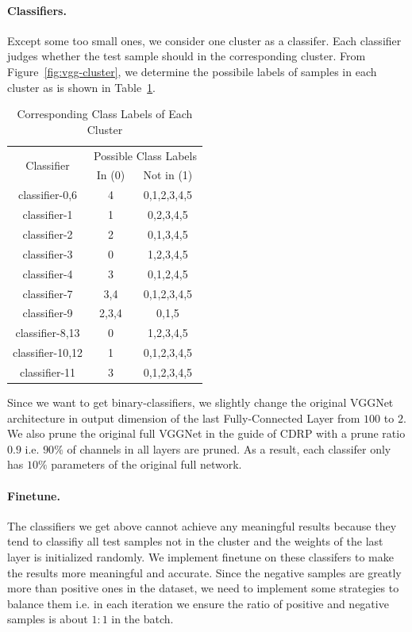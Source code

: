 \documentclass[sigplan,10pt,review]{acmart}\settopmatter{printfolios=true,printccs=false,printacmref=false}
\begin{document}
\paragraph{Classifiers.} Except some too small ones, we consider one cluster as a classifer. Each classifier judges whether the test sample should in the corresponding cluster. 
From Figure~\ref{fig:vgg-cluster}, we determine the possibile labels of samples in each cluster as is shown in Table~\ref{tab:cluster_label}. 

\begin{table}[!htp]
	\begin{tabular}{|c|c|c|}
	\hline
	\multirow{2}{*}{Classifier} &\multicolumn{2}{|c|}{Possible Class Labels}\\
	\cline{2-3}
	& In (0) & Not in (1)\\
	\hline
	classifier-0,6 & 4 & 0,1,2,3,4,5\\
	classifier-1 & 1 & 0,2,3,4,5\\
	classifier-2 & 2 & 0,1,3,4,5\\
	classifier-3 & 0 & 1,2,3,4,5\\
	classifier-4 & 3 & 0,1,2,4,5\\
	classifier-7 & 3,4 & 0,1,2,3,4,5\\ 
	classifier-9 & 2,3,4 & 0,1,5\\ 
	classifier-8,13 & 0 & 1,2,3,4,5\\
	classifier-10,12 & 1 & 0,1,2,3,4,5\\
	classifier-11 & 3 & 0,1,2,3,4,5\\
	\hline

	\end{tabular}
	\caption{Corresponding Class Labels of Each Cluster}
	\label{tab:cluster_label}
\end{table}

Since we want to get binary-classifiers, we slightly change the original VGGNet architecture in output dimension of the last Fully-Connected Layer from $100$ to $2$. 
We also prune the original full VGGNet in the guide of CDRP with a prune ratio $0.9$ i.e. $90\%$ of channels in all layers are pruned. 
As a result, each classifer only has $10\%$ parameters of the original full network.

\paragraph{Finetune.} The classifiers we get above cannot achieve any meaningful results because they tend to classifiy all test samples not in the cluster and the weights of the last layer is initialized randomly.
We implement finetune on these classifers to make the results more meaningful and accurate. 
Since the negative samples are greatly more than positive ones in the dataset, we need to implement some strategies to balance them i.e. in each iteration we ensure the ratio of positive and negative samples is about $1:1$ in the batch.
\end{document}
